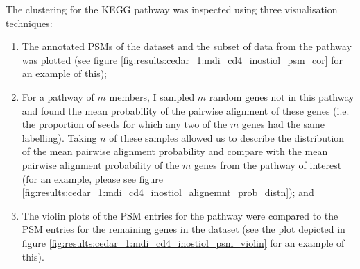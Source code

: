 \documentclass[12pt]{article} %
\begin{document}
	\newpage
	
%
%
		
	\newpage
	
	The clustering for the KEGG pathway was inspected using three visualisation techniques:
	\begin{enumerate}
		\item The annotated PSMs of the dataset and the subset of data from the pathway was plotted (see figure \ref{fig:results:cedar_1:mdi_cd4_inostiol_psm_cor} for an example of this);
		\item For a pathway of $m$ members, I sampled $m$ random genes not in this pathway and found the mean probability of the pairwise alignment of these genes (i.e. the proportion of seeds for which any two of the $m$ genes had the same labelling). Taking $n$ of these samples allowed us to describe the distribution of the mean pairwise alignment probability and compare with the mean pairwise alignment probability of the $m$ genes from the pathway of interest (for an example, please see figure \ref{fig:results:cedar_1:mdi_cd4_inostiol_alignemnt_prob_distn}); and
		\item The violin plots of the PSM entries for the pathway were compared to the PSM entries for the remaining genes in the dataset (see the plot depicted in figure \ref{fig:results:cedar_1:mdi_cd4_inostiol_psm_violin} for an example of this).
	\end{enumerate}
	
	
\end{document}
